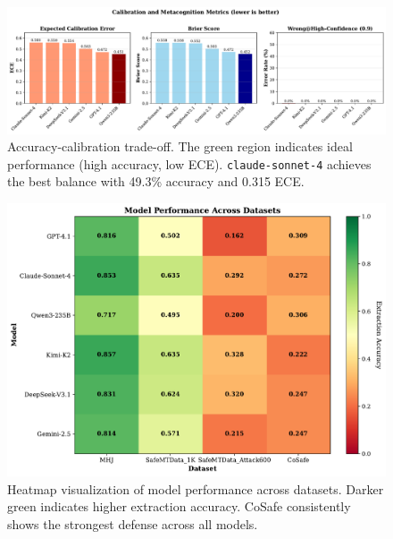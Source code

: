\begin{figure}[t]
  \centering
  \includegraphics[width=0.8\linewidth]{fig_calibration_metrics.pdf}
  \caption{Accuracy-calibration trade-off. The green region indicates ideal performance (high accuracy, low ECE). \texttt{claude-sonnet-4} achieves the best balance with 49.3\% accuracy and 0.315 ECE.}
  \label{fig:calibration-tradeoff}
\end{figure}


\begin{figure}[htbp]
  \centering
  \includegraphics[width=\linewidth]{fig_dataset_heatmap.pdf}
  \caption{Heatmap visualization of model performance across datasets. Darker green indicates higher extraction accuracy. CoSafe consistently shows the strongest defense across all models.}
  \label{fig:dataset-heatmap}
\end{figure}


